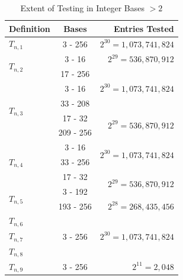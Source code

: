 \documentclass[conference]{IEEEtran}
\begin{document}
\renewcommand{\arraystretch}{1.25}
\begin{table}[H]
\label{tab:testing_bn}
\caption{Extent of Testing in Integer Bases $> 2$}
\centering
\begin{tabular}{|l|c|r|}
\hline
\textbf{Definition}       & \textbf{Bases}         & \textbf{Entries Tested}            \\\hline
$T_{n,1}$                 & 3 - 256                & $2^{30} = 1,073,741,824$           \\\hline
\multirow{2}{*}{$T_{n,2}$}& 3 - 16                 & $2^{29} = 536,870,912$             \\\cline{2-3}
                          & 17 - 256               &\multirow{3}{*}{$2^{30}=1,073,741,824$}\\\cline{1-2}
\multirow{4}{*}{$T_{n,3}$}& 3 - 16                 &                                    \\\cline{2-2} 
                          & 33 - 208               &                                    \\\cline{2-3} 
                          & 17 - 32                &\multirow{2}{*}{$2^{29}=536,870,912$}\\\cline{2-2}
                          & 209 - 256              &                                    \\\hline
\multirow{3}{*}{$T_{n,4}$}& 3 - 16                 &\multirow{2}{*}{$2^{30}=1,073,741,824$}\\\cline{2-2}
                          & 33 - 256               &                                    \\\cline{2-3}
                          & 17 - 32                &\multirow{2}{*}{$2^{29}=536,870,912$}\\\cline{1-2} 
\multirow{2}{*}{$T_{n,5}$}& 3 - 192                &                                    \\\cline{2-3}
                          & 193 - 256              & $2^{28} = 268,435,456$             \\\hline
$T_{n,6}$                 &\multirow{3}{*}{3 - 256}&\multirow{3}{*}{$2^{30}=1,073,741,824$}\\\cline{1-1}
$T_{n,7}$                 &                        &                                    \\\cline{1-1}
$T_{n,8}$                 &                        &                                    \\\hline
$T_{n,9}$                 & 3 - 256                & $2^{11} = 2,048$                  \\\hline
\end{tabular}
\end{table}
\end{document}
